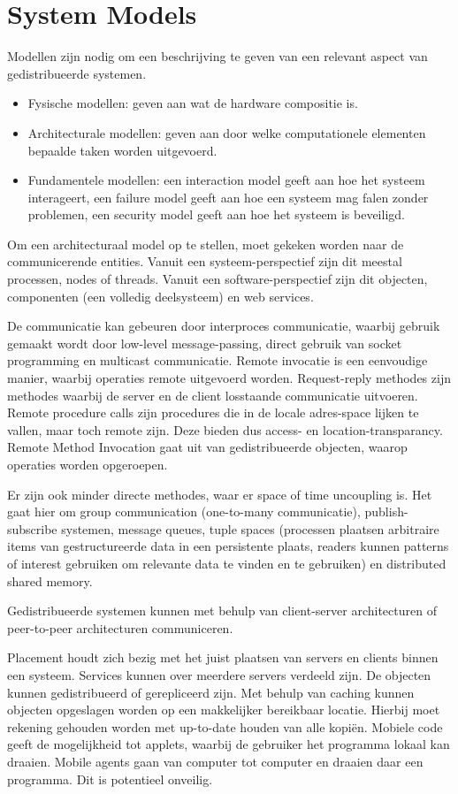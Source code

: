 \documentclass[../samenvatting.tex]{subfiles}
\begin{document}
\chapter{System Models}
Modellen zijn nodig om een beschrijving te geven van een relevant aspect van gedistribueerde systemen.
\begin{itemize}
	\item Fysische modellen: geven aan wat de hardware compositie is.
	\item Architecturale modellen: geven aan door welke computationele elementen bepaalde taken worden uitgevoerd.
	\item Fundamentele modellen: een interaction model geeft aan hoe het systeem interageert, een failure model geeft aan hoe een systeem mag falen zonder problemen, een security model geeft aan hoe het systeem is beveiligd.
\end{itemize}

Om een architecturaal model op te stellen, moet gekeken worden naar de communicerende entities. Vanuit een systeem-perspectief zijn dit meestal processen, nodes of threads. Vanuit een software-perspectief zijn dit objecten, componenten (een volledig deelsysteem) en web services. 

De communicatie kan gebeuren door interproces communicatie, waarbij gebruik gemaakt wordt door low-level message-passing, direct gebruik van socket programming en multicast communicatie. Remote invocatie is een eenvoudige manier, waarbij operaties remote uitgevoerd worden. Request-reply methodes zijn methodes waarbij de server en de client losstaande communicatie uitvoeren. Remote procedure calls zijn procedures die in de locale adres-space lijken te vallen, maar toch remote zijn. Deze bieden dus access- en location-transparancy. Remote Method Invocation gaat uit van gedistribueerde objecten, waarop operaties worden opgeroepen.

Er zijn ook minder directe methodes, waar er space of time uncoupling is. Het gaat hier om group communication (one-to-many communicatie), publish-subscribe systemen, message queues, tuple spaces (processen plaatsen arbitraire items van gestructureerde data in een persistente plaats, readers kunnen patterns of interest gebruiken om relevante data te vinden en te gebruiken) en distributed shared memory.

Gedistribueerde systemen kunnen met behulp van client-server architecturen of peer-to-peer architecturen communiceren.

Placement houdt zich bezig met het juist plaatsen van servers en clients binnen een systeem. Services kunnen over meerdere servers verdeeld zijn. De objecten kunnen gedistribueerd of gerepliceerd zijn. Met behulp van caching kunnen objecten opgeslagen worden op een makkelijker bereikbaar locatie. Hierbij moet rekening gehouden worden met up-to-date houden van alle kopiën. Mobiele code geeft de mogelijkheid tot applets, waarbij de gebruiker het programma lokaal kan draaien. Mobile agents gaan van computer tot computer en draaien daar een programma. Dit is potentieel onveilig.
\end{document}
